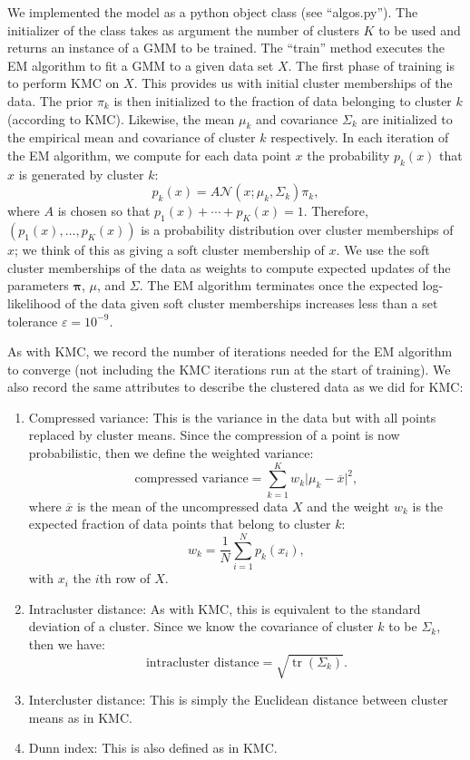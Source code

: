 \documentclass[12pt]{article}
\newcommand{\eps}{\varepsilon}
\begin{document}
We implemented the model as a python object class (see ``algos.py''). The initializer of the class takes as argument the number of clusters $K$ to be used and returns an instance of a GMM to be trained. The ``train'' method executes the EM algorithm to fit a GMM to a given data set $X$. The first phase of training is to perform KMC on $X$. This provides us with initial cluster memberships of the data. The prior $\pi_k$ is then initialized to the fraction of data belonging to cluster $k$ (according to KMC). Likewise, the mean $\mu_k$ and covariance $\Sigma_k$ are initialized to the empirical mean and covariance of cluster $k$ respectively. In each iteration of the EM algorithm, we compute for each data point $x$ the probability $p_k(x)$ that $x$ is generated by cluster $k$:
\[ p_k(x) = A \mathcal{N}(x; \mu_k, \Sigma_k)\pi_k, \]
where $A$ is chosen so that $p_1(x)+\cdots +p_K(x)=1$. Therefore, $(p_1(x),\ldots,p_K(x))$ is a probability distribution over cluster memberships of $x$; we think of this as giving a soft cluster membership of $x$. We use the soft cluster memberships of the data as weights to compute expected updates of the parameters $\mathbf{\pi}$, $\mu$, and $\Sigma$. The EM algorithm terminates once the expected log-likelihood of the data given soft cluster memberships increases less than a set tolerance $\eps = 10^{-9}$.

As with KMC, we record the number of iterations needed for the EM algorithm to converge (not including the KMC iterations run at the start of training). We also record the same attributes to describe the clustered data as we did for KMC:
\begin{enumerate}
\item Compressed variance: This is the variance in the data but with all points replaced by cluster means. Since the compression of a point is now probabilistic, then we define the weighted variance:
\[ \mbox{compressed variance} = \sum_{k=1}^K w_k \lvert\mu_k-\overline{x}\rvert^2, \]
where $\overline{x}$ is the mean of the uncompressed data $X$ and the weight $w_k$ is the expected fraction of data points that belong to cluster $k$:
\[ w_k = \frac{1}{N}\sum_{i=1}^N p_k(x_i), \]
with $x_i$ the $i$th row of $X$.
\item Intracluster distance: As with KMC, this is equivalent to the standard deviation of a cluster. Since we know the covariance of cluster $k$ to be $\Sigma_k$, then we have:
\[ \mbox{intracluster distance} = \sqrt{\operatorname{tr}(\Sigma_k)}. \]
\item Intercluster distance: This is simply the Euclidean distance between cluster means as in KMC.
\item Dunn index: This is also defined as in KMC.
\end{enumerate}
\end{document}
